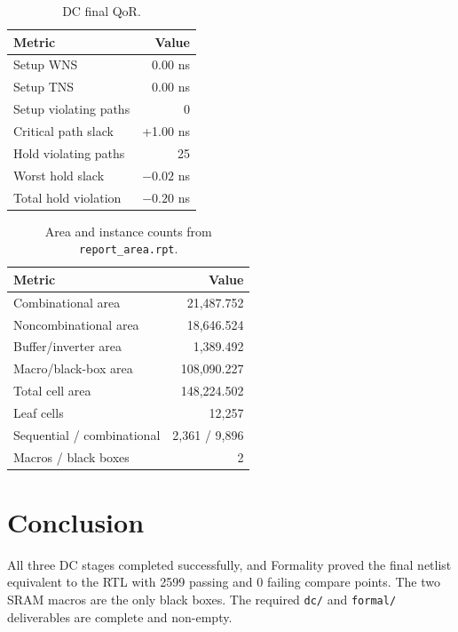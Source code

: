 \documentclass[11pt]{article}
\begin{document}
\begin{table}[H]
\centering
\small
\caption{DC final QoR.}
\begin{tabular}{@{}lr@{}}
\toprule
Metric & Value \\
\midrule
Setup WNS & 0.00 ns \\
Setup TNS & 0.00 ns \\
Setup violating paths & 0 \\
Critical path slack & +1.00 ns \\
Hold violating paths & 25 \\
Worst hold slack & $-0.02$ ns \\
Total hold violation & $-0.20$ ns \\
\bottomrule
\end{tabular}
\end{table}

\begin{table}[H]
\centering
\small
\caption{Area and instance counts from \texttt{report\_area.rpt}.}
\begin{tabular}{@{}lr@{}}
\toprule
Metric & Value \\
\midrule
Combinational area & 21{,}487.752 \\
Noncombinational area & 18{,}646.524 \\
Buffer/inverter area & 1{,}389.492 \\
Macro/black-box area & 108{,}090.227 \\
Total cell area & 148{,}224.502 \\
Leaf cells & 12{,}257 \\
Sequential / combinational & 2{,}361 / 9{,}896 \\
Macros / black boxes & 2 \\
\bottomrule
\end{tabular}
\end{table}

\section{Conclusion}

All three DC stages completed successfully, and Formality proved the final
netlist equivalent to the RTL with 2599 passing and 0 failing compare points.
The two SRAM macros are the only black boxes. The required \texttt{dc/} and
\texttt{formal/} deliverables are complete and non-empty.
\end{document}
